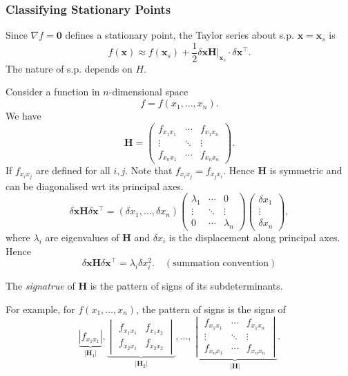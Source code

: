 \documentclass[a4paper]{article}
\begin{document}
      \subsubsection{Classifying Stationary Points}
      Since $ \nabla f= \mathbf{0} $ defines a stationary point, the Taylor series about s.p. $ \mathbf{x}=\mathbf{x}_s $ is 
      \[
          f(\mathbf{x})\approx f(\mathbf{x}_s)+\frac{1}{2}\delta\mathbf{x} \mathbf{H}\Big|_{\mathbf{x}_s}\cdot \delta\mathbf{x}^{\top}.
      \]
      The nature of s.p. depends on $H$.

      Consider a function in $n$-dimensional space 
      \[
          f=f(x_1,\dots,x_n).
      \]
      We have
      \[
          \mathbf{H} = \begin{pmatrix}
              f_{x_1x_1}& \cdots & f_{x_1x_n}\\
              \vdots & \ddots & \vdots \\
              f_{x_nx_1}& \cdots & f_{x_nx_n}
          \end{pmatrix}.
      \]
      If $f_{x_ix_j}$ are defined for all $i,j$. Note that $f_{x_ix_j}=f_{x_jx_i}$. Hence $\mathbf{H}$ is symmetric and can be diagonalised wrt its principal axes.
      \[
          \delta\mathbf{x} \mathbf{H} \delta\mathbf{x}^{\top} = (\delta x_1,\dots,\delta x_n) \begin{pmatrix}
              \lambda_1&\cdots&0\\
              \vdots &\ddots &\vdots \\
              0& \cdots & \lambda_n
          \end{pmatrix}\begin{pmatrix}
              \delta x_1\\\vdots \\\delta x_n
          \end{pmatrix},
      \]
      where $ \lambda_i $ are eigenvalues of $\mathbf{H}$ and $ \delta x_i $ is the displacement along principal axes. Hence 
      \[
        \delta\mathbf{x} \mathbf{H} \delta\mathbf{x}^{\top} = \lambda_i\delta x_i^2.\quad (\text{summation convention})
      \]
      \begin{definition}
          The \textit{signatrue} of $\mathbf{H}$ is the pattern of signs of its subdeterminants.
      \end{definition}
      For example, for $f(x_1,\dots,x_n)$, the pattern of signs is the signs of 
      \[
          \underbrace{|f_{x_1x_1}|}_{|\mathbf{H}_1|}, \underbrace{\begin{vmatrix}
              f_{x_1x_1}&f_{x_1x_2}\\
              f_{x_2x_1}&f_{x_2x_2}
          \end{vmatrix}}_{|\mathbf{H}_2|}, \dots,\underbrace{\begin{vmatrix}
            f_{x_1x_1}& \cdots & f_{x_1x_n}\\
            \vdots & \ddots & \vdots \\
            f_{x_nx_1}& \cdots & f_{x_nx_n}
          \end{vmatrix}}_{|\mathbf{H}|}.
      \]
\end{document}
